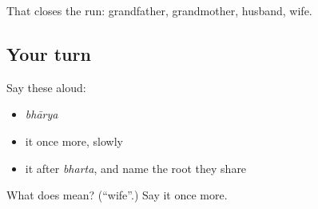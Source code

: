 \begin{grammarlens}[title={What you've built}]
That closes the run: grandfather, grandmother, husband, wife.
\end{grammarlens}

\subsection*{Your turn}
Say these aloud:

\begin{itemize}
\raggedright
  \item \emph{bhārya}
  \item it once more, slowly
  \item it after \emph{bharta}, and name the root they share
\end{itemize}

\begin{tcolorbox}[breakable,colback=teal!4,colframe=teal!35!black,title={Before you move on}]
What does  mean? (\textquotedblleft{}wife\textquotedblright{}.) Say it once more.
\end{tcolorbox}
